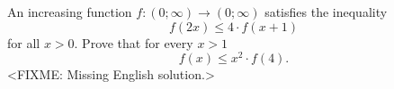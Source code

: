 \problem
An increasing function $f \colon (0; \infty) \to (0; \infty)$ satisfies the
inequality
\[
    f(2 x) \leq 4 \cdot f(x + 1)
\]
for all $x > 0$.
Prove that for every $x > 1$
\[
    f(x) \leq x^2 \cdot f(4)
.\]
\solution
<FIXME: Missing English solution.>
\endproblem
